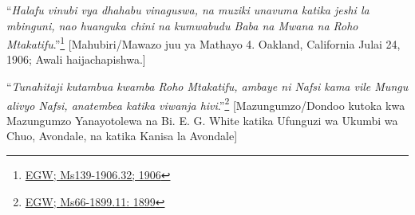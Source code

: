 “\textit{Halafu vinubi vya dhahabu vinaguswa, na muziki unavuma katika jeshi la mbinguni, nao huanguka chini na kumwabudu Baba na Mwana na Roho Mtakatifu}.”\footnote{\href{https://egwwritings.org/?ref=en_Ms139-1906.32&para=9579.38}{EGW; Ms139-1906.32; 1906}} [Mahubiri/Mawazo juu ya Mathayo 4. Oakland, California Julai 24, 1906; Awali haijachapishwa.]

“\textit{Tunahitaji kutambua kwamba Roho Mtakatifu, ambaye ni Nafsi kama vile Mungu alivyo Nafsi, anatembea katika viwanja hivi}.”\footnote{\href{https://egwwritings.org/?ref=en_Ms66-1899.11&para=6622.19}{EGW; Ms66-1899.11: 1899}} [Mazungumzo/Dondoo kutoka kwa Mazungumzo Yanayotolewa na Bi. E. G. White katika Ufunguzi wa Ukumbi wa Chuo, Avondale, na katika Kanisa la Avondale]

